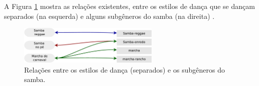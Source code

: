 A Figura \ref{fig:sambadavavsmusicaseparado} mostra as relações existentes, 
entre os estilos de dança que se dançam separados (na esquerda) 
e alguns subgêneros do samba (na direita)  \cite[pp. 134-138]{perna2002samba}.

\begin{figure}[h]
  \centering
    \includegraphics[width=0.6\textwidth]{chapters/cap-historia-dancasamba/dancavcmusicaseparado.eps}
  \caption{Relações entre os estilos de dança (separados) e os subgêneros do samba.}
\label{fig:sambadavavsmusicaseparado}
\end{figure}
